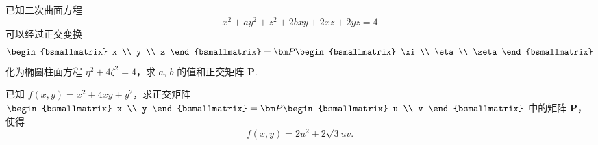 	\begin{titwo}
		已知二次曲面方程
		\[
			x^{2} + ay^{2} + z^{2} + 2bxy + 2xz + 2yz = 4
		\]
		可以经过正交变换
		\[
			\begin{bsmallmatrix}
				x \\
				y \\
				z
			\end{bsmallmatrix} = \bm P
			\begin{bsmallmatrix}
				\xi \\
				\eta \\
				\zeta
			\end{bsmallmatrix}
		\]
		化为椭圆柱面方程 $\eta^{2} + 4 \zeta^{2} = 4$，求 $a$, $b$ 的值和正交矩阵 $\bm P$.
	\end{titwo}

	\begin{titwo}
		已知 $f(x,y) = x^{2} + 4xy + y^{2}$，求正交矩阵 $\begin{bsmallmatrix}
			x \\
			y
		\end{bsmallmatrix} = \bm P \begin{bsmallmatrix}
			u \\
			v
		\end{bsmallmatrix}$ 中的矩阵 $\bm P$，使得
		\[
			f(x,y) = 2u^{2} + 2\sqrt{3} uv.
		\]
	\end{titwo}